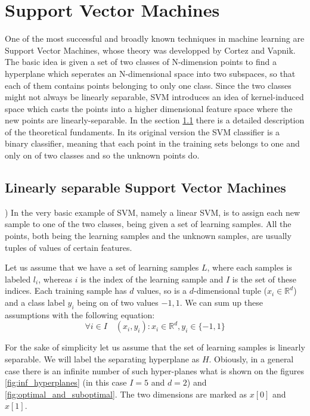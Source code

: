 \section{Support Vector Machines}
One of the most successful and broadly known techniques in machine learning are Support Vector Machines, whose theory was developped by Cortez and Vapnik. The basic idea is given a set of two classes of N-dimension points to find a hyperplane which seperates an N-dimensional space into two subspaces, so that each of them contains points belonging to only one class. Since the two classes might not always be linearly separable, SVM introduces an idea of kernel-induced space which casts the points into a higher dimensional feature space where the new points are linearly-separable. In the section \ref{subsec:linear_svm} there is a detailed description of the theoretical fundaments. In its original version the SVM classifier is a binary classifier, meaning that each point in the training sets belongs to one and only on of two classes and so the unknown points do.

\subsection{Linearly separable Support Vector Machines} \label{subsec:linear_svm})
In the very basic example of SVM, namely a linear SVM, is to assign each new sample to one of the two classes, being given a set of learning samples. All the points, both being the learning samples and the unknown samples, are usually tuples of values of certain features.

Let us assume that we have a set of learning samples $L$, where each samples is labeled $l_i$, whereas $i$ is the index of the learning sample and $I$ is the set of these indices. Each training sample has $d$ values, so is a $d$-dimensional tuple ($x_i \in \mathbb{R}^d$) and a class label $y_i$ being on of two values ${-1, 1}$. We can sum up these assumptions with the following equation:
\begin{equation}
\forall{i \in I} \quad \left(x_i, y_i\right) : x_i \in \mathbb{R}^d, y_i \in \{-1, 1\}
\end{equation} 

For the sake of simplicity let us assume that the set of learning samples is linearly separable. We will label the separating hyperplane as $H$. Obiously, in a general case there is an infinite number of such hyper-planes what is shown on the figures \ref{fig:inf_hyperplanes} (in this case $I=5$ and $d=2$) and \ref{fig:optimal_and_suboptimal}. The two dimensions are marked as $x[0]$ and $x[1]$.

